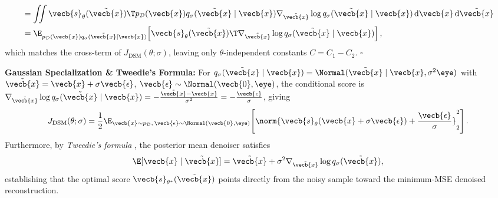 \documentclass[../../../../master.tex]{subfiles}
\begin{document}
\begin{coremath}
\begin{align*}
  &= \iint \vecb{s}_\theta(\tilde{\vecb{x}})\T p_{\mathcal{D}}(\vecb{x}) q_\sigma(\tilde{\vecb{x}} \mid \vecb{x}) \nabla_{\tilde{\vecb{x}}}\log q_\sigma(\tilde{\vecb{x}} \mid \vecb{x})\,\mathrm{d}\vecb{x}\,\mathrm{d}\tilde{\vecb{x}} \\
  &= \E_{p_{\mathcal{D}}(\vecb{x}) q_\sigma(\tilde{\vecb{x}} \mid \vecb{x})}\!\left[\vecb{s}_\theta(\tilde{\vecb{x}})\T \nabla_{\tilde{\vecb{x}}}\log q_\sigma(\tilde{\vecb{x}} \mid \vecb{x})\right],
\end{align*}
which matches the cross-term of $J_{\mathrm{DSM}}(\theta;\sigma)$, leaving only $\theta$-independent constants $C = C_1 - C_2$. \hfill $\square$

\textbf{Gaussian Specialization \& Tweedie's Formula:} For $q_\sigma(\tilde{\vecb{x}} \mid \vecb{x}) = \Normal(\tilde{\vecb{x}} \mid \vecb{x}, \sigma^2 \eye)$ with $\tilde{\vecb{x}} = \vecb{x} + \sigma \vecb{\epsilon}$, $\vecb{\epsilon} \sim \Normal(\vecb{0}, \eye)$, the conditional score is $\nabla_{\tilde{\vecb{x}}}\log q_\sigma(\tilde{\vecb{x}} \mid \vecb{x}) = -\frac{\tilde{\vecb{x}} - \vecb{x}}{\sigma^2} = -\frac{\vecb{\epsilon}}{\sigma}$, giving
\begin{equation}
  J_{\mathrm{DSM}}(\theta;\sigma) = \frac{1}{2}\E_{\vecb{x} \sim p_{\mathcal{D}},\, \vecb{\epsilon} \sim \Normal(\vecb{0},\eye)}\!\left[\norm{\vecb{s}_\theta(\vecb{x} + \sigma\vecb{\epsilon}) + \frac{\vecb{\epsilon}}{\sigma}}_2^2\right].
  \label{eq:ebm:dsm_gauss}
\end{equation}
Furthermore, by \emph{Tweedie's formula} , the posterior mean denoiser satisfies
\begin{equation}
  \E[\vecb{x} \mid \tilde{\vecb{x}}] = \tilde{\vecb{x}} + \sigma^2 \nabla_{\tilde{\vecb{x}}} \log q_\sigma(\tilde{\vecb{x}}),
  \label{eq:ebm:tweedie}
\end{equation}
establishing that the optimal score $\vecb{s}_{\theta^*}(\tilde{\vecb{x}})$ points directly from the noisy sample toward the minimum-MSE denoised reconstruction.
\end{coremath}
\end{document}

